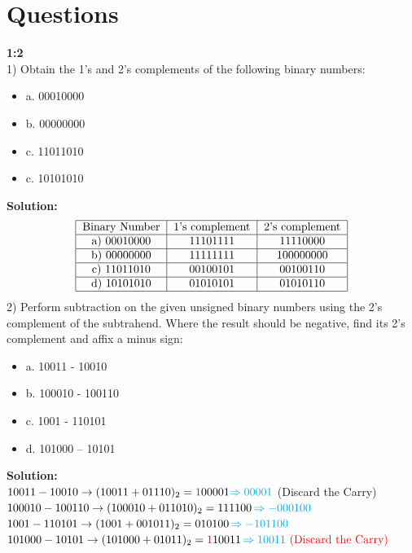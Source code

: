 \documentclass[a4paper,12pt]{extarticle}
\begin{document}
\section*{\LARGE Questions }\textbf{\LARGE {1:2}}\\[0.5cm]
1) Obtain the 1’s and 2’s complements of the following binary numbers:
\begin{itemize}
\item a. 00010000
\item b. 00000000
\item c. 11011010
\item c. 10101010
\end{itemize}
{\color{blue}\textbf{Solution:}}
\begin{align*}
\begin{tabular}{|c|c|c|}
\hline 
Binary Number & 1's complement & 2's complement \\ 
\hline 
a) 00010000 & 11101111 & 11110000 \\ 
\hline 
b) 00000000 & 11111111 & 100000000 \\ 
\hline 
c) 11011010 & 00100101 & 00100110 \\ 
\hline 
d) 10101010 & 01010101 & 01010110 \\ 
\hline 
\end{tabular}
\end{align*}
\color{black}2) Perform subtraction on the given unsigned binary numbers using the 2’s complement of
the subtrahend. Where the result should be negative, find its 2’s complement and affix
a minus sign:
\begin{itemize}
\item a. 10011 - 10010
\item b. 100010 - 100110
\item c. 1001 - 110101
\item d. 101000 – 10101
\end{itemize}
{\color{blue}\textbf{Solution:}}\\[0.3cm]
 $10011 - 10010 \rightarrow (10011+ 01110)_2 = { \color{red}1}00001 {\color{cyan} \Rightarrow 00001}$ { \color{red} (Discard the Carry)}\\[0.4cm]
 $100010 - 100110 \rightarrow (100010+ 011010)_2 = 111100 \, { \color{cyan}  \Rightarrow -000100 } $\\[0.4cm]
 $1001 - 110101 \rightarrow (1001 + 001011)_2 = 010100 \, { \color{cyan}  \Rightarrow -101100 } $\\[0.4cm]
 $101000 - 10101 \rightarrow (101000 + 01011 )_2 = { \color{red}1}10011 \, { \color{cyan} \Rightarrow 10011 } \text{ \color{red} (Discard the Carry)} $
\newpage
\end{document}
